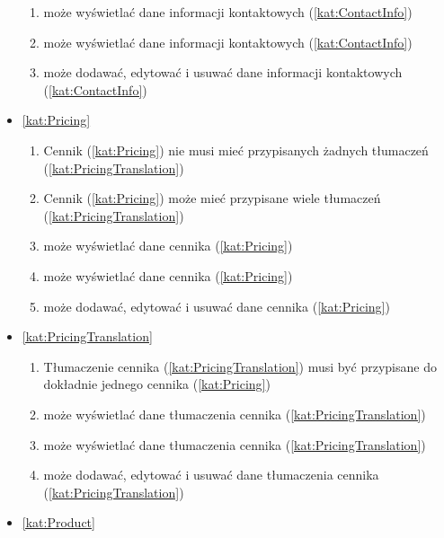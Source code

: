 \begin{itemize}[label={\textbf{Reguły dla}}, wide, labelwidth=!, labelindent=0pt]
\begin{enumerate}[label={\textbf{REG/\protect\threedigits{\arabic{enumi}}}}, wide, labelwidth=!, align=left, leftmargin=3cm, resume]
        \item {} może wyświetlać dane informacji kontaktowych (\ref{kat:ContactInfo})
        \item {} może wyświetlać dane informacji kontaktowych (\ref{kat:ContactInfo})
        \item {} może dodawać, edytować i usuwać dane informacji kontaktowych (\ref{kat:ContactInfo})
    \end{enumerate}
    \item\ref{kat:Pricing}
    \begin{enumerate}[label={\textbf{REG/\protect\threedigits{\arabic{enumi}}}}, wide, labelwidth=!, align=left, leftmargin=3cm, resume]
        \item Cennik (\ref{kat:Pricing}) nie musi mieć przypisanych żadnych tłumaczeń (\ref{kat:PricingTranslation})
        \item Cennik (\ref{kat:Pricing}) może mieć przypisane wiele tłumaczeń (\ref{kat:PricingTranslation})
        \item {} może wyświetlać dane cennika (\ref{kat:Pricing})
        \item {} może wyświetlać dane cennika (\ref{kat:Pricing})
        \item {} może dodawać, edytować i usuwać dane cennika (\ref{kat:Pricing})
    \end{enumerate}
    \item\ref{kat:PricingTranslation}
    \begin{enumerate}[label={\textbf{REG/\protect\threedigits{\arabic{enumi}}}}, wide, labelwidth=!, align=left, leftmargin=3cm, resume]
        \item Tłumaczenie cennika (\ref{kat:PricingTranslation}) musi być przypisane do dokładnie jednego cennika (\ref{kat:Pricing})
        \item {} może wyświetlać dane tłumaczenia cennika (\ref{kat:PricingTranslation})
        \item {} może wyświetlać dane tłumaczenia cennika (\ref{kat:PricingTranslation})
        \item {} może dodawać, edytować i usuwać dane tłumaczenia cennika (\ref{kat:PricingTranslation})
    \end{enumerate}
    \item\ref{kat:Product}
    \begin{enumerate}[label={\textbf{REG/\protect\threedigits{\arabic{enumi}}}}, wide, labelwidth=!, align=left, leftmargin=3cm, resume]

\end{enumerate}
\end{itemize}
